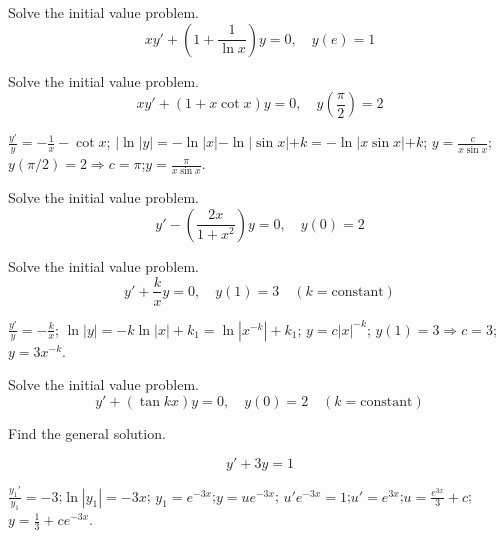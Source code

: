 \documentclass{ximera}
\begin{document}
\begin{problem}\label{exer:2.1.7} Solve
the initial value problem.
$$xy'+\left(1+\frac{1}{\ln x}\right)y=0,\quad y(e)=1$$
\end{problem}

\begin{problem}\label{exer:2.1.8} Solve
the initial value problem.
$$xy'+(1+ x\cot x)y=0,\quad y\left(\frac{\pi}{2}
\right)=2$$



\begin{solution}
    $\frac{y'}{y}=-\frac{1}{x}-\cot x$;
\quad $|\ln|y|=-\ln|x|-\ln|\sin x|+k=-\ln|x\sin x|+k$;\quad
$y=\frac{c}{x\sin x}$;\quad $y(\pi/2)=2\Rightarrow
c=\pi$;\quad $y=\frac{\pi}{x\sin x}$.
\end{solution}
\end{problem}

\begin{problem}\label{exer:2.1.9} Solve
the initial value problem.
$$y'-\left(\frac{2x}{1+x^2}\right)y=0,\quad y(0)=2$$
\end{problem}

\begin{problem}\label{exer:2.1.10} Solve
the initial value problem.
$$y'+\frac{k}{x}y=0,\quad y(1)=3 \quad (k=
\mbox{constant})$$

\begin{solution}
    $\frac{y'}{ y}=-\frac{k}{ x}$;\quad
$\ln|y|=-k\ln|x|+k_1=\ln|x^{-k}|+k_1$;\quad
$y=c|x|^{-k}$;\quad
$y(1)=3\Rightarrow c=3$;\quad $y=3x^{-k}$.
\end{solution}
\end{problem}

\begin{problem}\label{exer:2.1.11} Solve
the initial value problem.
$$y'+(\tan kx)y=0,\quad y(0)=2 \quad (k= \mbox{constant})$$
\end{problem}


\begin{problem}\label{exer:2.1.12} Find
the general solution. 

$$y'+3y=1$$





\begin{solution}
    $\frac{y_1'}{ y_1}=-3$;\quad $\ln|y_1|=-3x$;\quad
$y_1=e^{-3x}$;\quad $y=ue^{-3x}$;\quad
$u'e^{-3x}=1$;\quad $u'=e^{3x}$;\quad $u=\frac{e^{3x}}{3}+c$;\quad
$y=\frac{1}{3}+ce^{-3x}$.
\end{solution}

\end{problem}
\end{document}
